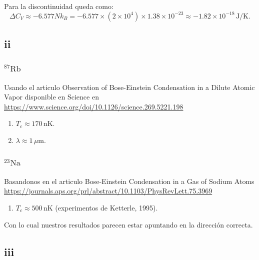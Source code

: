 \documentclass{report}
\begin{document}
   Para la discontinuidad queda como:
   \[
   \Delta C_V \approx -6.577 N k_B = -6.577 \times (2 \times 10^4) \times 1.38 \times 10^{-23} \approx -1.82 \times 10^{-18} \, \text{J/K}.
   \]

\subsection{ii}
\subsubsection{$^{87}\text{Rb}$}
Usando el articulo Observation of Bose-Einstein Condensation in a Dilute Atomic Vapor disponible en Science en \url{https://www.science.org/doi/10.1126/science.269.5221.198}
  \begin{enumerate}
  \item \( T_c \approx 170 \, \text{nK} \).
  \item \( \lambda \approx 1 \, \mu\text{m} \).  
  \end{enumerate}

\subsubsection{$^{23}\text{Na}$}

Basandonos en el articulo Bose-Einstein Condensation in a Gas of Sodium Atoms \url{https://journals.aps.org/prl/abstract/10.1103/PhysRevLett.75.3969}

  \begin{enumerate}
  \item \( T_c \approx 500 \, \text{nK} \) (experimentos de Ketterle, 1995).  
  \end{enumerate}

Con lo cual nuestros resultados parecen estar apuntando en la dirección correcta.

\subsection{iii}
\end{document}
